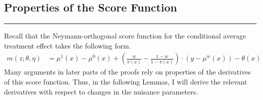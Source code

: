 \subsection{Properties of the Score Function}
\hrule

Recall that the Neymann-orthogonal score function for the conditional average treatment effect takes the following form.
\begin{equation}
    \begin{aligned}
        m\left(z; \theta, \eta\right)
		& = \mu^{1}\left(x\right) - \mu^{0}\left(x\right) 
        + \left(\frac{w}{\pi\left(x\right)} - \frac{1 - w}{1 - \pi\left(x\right)}\right) \cdot \left(y - \mu^{w}\left(x\right)\right) -  \theta\left(x\right)
	\end{aligned}
\end{equation}
Many arguments in later parts of the proofs rely on properties of the derivatives of this score function.
Thus, in the following Lemmas, I will derive the relevant derivatives with respect to changes in the nuisance parameters.



